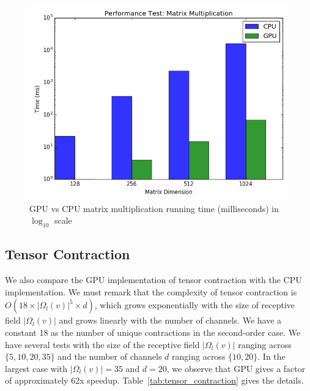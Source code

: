 \documentclass[a4paper]{article}
\begin{document}
\begin{figure}[h]
\includegraphics[width=\columnwidth]{Matrix_Multiplication}
\caption{GPU vs CPU matrix multiplication running time (milliseconds) in $\log_{10}$ scale}
\label{fig:matrix_mult}
\end{figure}

\subsection{Tensor Contraction}

We also compare the GPU implementation of tensor contraction with the CPU implementation. We must remark that the complexity of tensor contraction is $O(18 \times |\Omega_l(v)|^5 \times d)$, which grows exponentially with the size of receptive field $|\Omega_l(v)|$ and grows linearly with the number of channels. We have a constant 18 as the number of unique contractions in the second-order case. We have several tests with the size of the receptive field $|\Omega_l(v)|$ ranging across $\{5, 10, 20, 35\}$ and the number of channels $d$ ranging across $\{10, 20\}$. In the largest case with $|\Omega_l(v)| = 35$ and $d = 20$, we observe that GPU gives a factor of approximately 62x speedup. Table~\ref{tab:tensor_contraction} gives the details.
  
\end{document}
